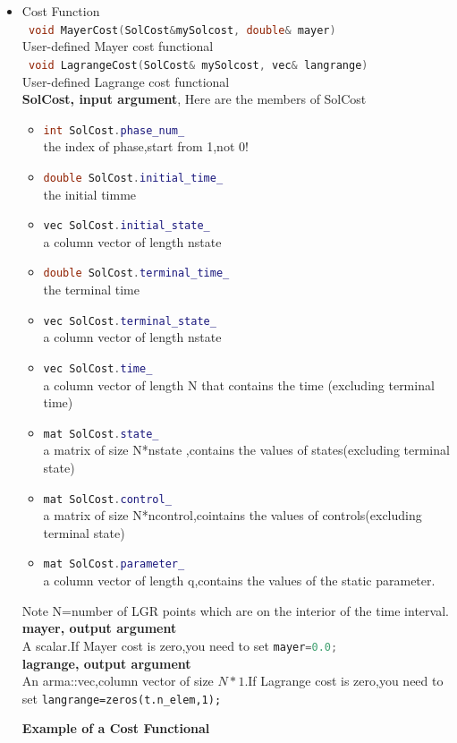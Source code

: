 \documentclass[10pt]{article}
\begin{document}
	 \begin{itemize}
		\item Cost Function \\
		\lstinline[language=C++]| void MayerCost(SolCost&mySolcost, double& mayer)|\\
		User-defined Mayer cost functional\\
		\lstinline[language=C++]| void LagrangeCost(SolCost& mySolcost, vec& langrange)|\\
		User-defined Lagrange cost functional\\
		\textbf{SolCost, input argument}, Here are the members of SolCost 
		\begin{itemize}
			\item \lstinline[language=C++]|int SolCost.phase_num_|\\the index of phase,start from 1,not 0!
			\item \lstinline[language=C++]|double SolCost.initial_time_|\\ the initial timme
			\item \lstinline[language=C++]|vec SolCost.initial_state_|  \\ a column vector of length nstate
			\item \lstinline[language=C++]|double SolCost.terminal_time_|\\the terminal time
			\item \lstinline[language=C++]|vec SolCost.terminal_state_| \\ a column vector of length nstate
			\item \lstinline[language=C++]|vec SolCost.time_|\\a column vector of length N that contains the time (excluding terminal time)
			\item \lstinline[language=C++]|mat SolCost.state_| \\ a matrix of size N*nstate ,contains the values of states(excluding terminal state)
			\item \lstinline[language=C++]|mat SolCost.control_|\\a matrix of size N*ncontrol,cointains the values of controls(excluding terminal state)
			\item \lstinline[language=C++]|mat SolCost.parameter_| \\a column vector of length q,contains the values of the static parameter.
			\end{itemize}
		Note N=number of LGR points which are on the interior of the time interval.\\
		\textbf{mayer, output argument}\\
		A scalar.If Mayer cost is zero,you need to set 	\lstinline[language=C++]|mayer=0.0;|\\
		\textbf{lagrange, output argument}\\
		An arma::vec,column vector of size $N*1$.If Lagrange cost is zero,you need to set \lstinline|langrange=zeros(t.n_elem,1);|\\
		\begin{frame}
			{\noindent}{\bf Example of a Cost Functional}
			

\end{frame}
\end{itemize}
\end{document}
